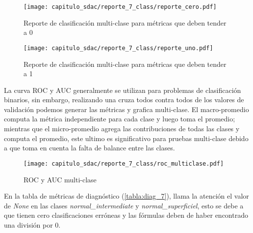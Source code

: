 \begin{figure}[H]
    \centering
    \texttt{[image: capitulo\_sdac/reporte\_7\_class/reporte\_cero.pdf]}
    \caption{Reporte de clasificación multi-clase para métricas que deben tender a 0}\label{fig:reporte_7_0}
\end{figure}

\begin{figure}[H]
    \centering
    \texttt{[image: capitulo\_sdac/reporte\_7\_class/reporte\_uno.pdf]}
    \caption{Reporte de clasificación multi-clase para métricas que deben tender a 1}\label{fig:reporte_7_1}
\end{figure}

La curva ROC y AUC generalmente se utilizan para problemas de clasificación
binarios, sin embargo, realizando una cruza todos contra todos de los valores de
validación podemos generar las métricas y grafica multi-clase. El macro-promedio
computa la métrica independiente para cada clase y luego toma el promedio;
mientras que el micro-promedio agrega las contribuciones de todas las clases y
computa el promedio, este ultimo es significativo para pruebas multi-clase
debido a que toma en cuenta la falta de balance entre las clases.

\begin{figure}[H]
    \centering
    \texttt{[image: capitulo\_sdac/reporte\_7\_class/roc\_multiclase.pdf]}
    \caption{ROC y AUC multi-clase} 
    \label{fig:matriz_norm_7}
\end{figure} 

En la tabla de métricas de diagnóstico (\autoref{tabla:diag_7}), llama la
atención el valor de \emph{None} en las clases \emph{normal\_intermediate} y
\emph{normal\_superficiel}, esto se debe a que tienen cero clasificaciones
erróneas y las fórmulas deben de haber encontrado una división por 0. 

